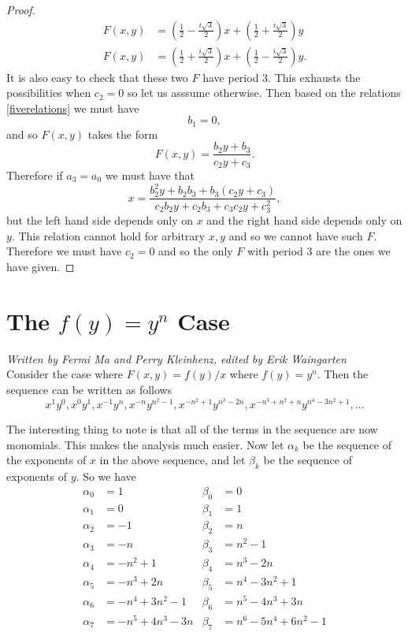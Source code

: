 \documentclass[12pt]{article}
\begin{document}
\begin{proof}
\begin{align*}
F(x,y) &= \left( \frac{1}{2} -\frac{i\sqrt{3}}{2} \right) x + \left( \frac{1}{2} +\frac{i\sqrt{3}}{2} \right) y \\
F(x,y) &= \left( \frac{1}{2} +\frac{i\sqrt{3}}{2} \right) x + \left( \frac{1}{2} -\frac{i\sqrt{3}}{2} \right) y.
\end{align*}
It is also easy to check that these two $F$ have period 3. This exhausts the possibilities when $c_2=0$ so let us asssume otherwise. Then based on the relations \ref{fiverelations} we must have 
\begin{equation*}
b_1 = 0,
\end{equation*}
and so $F(x,y)$ takes the form 
\begin{equation*}
F(x,y) = \frac{b_2 y + b_3}{c_2 y + c_3}.
\end{equation*}
Therefore if $a_3 = a_0$ we must have that 
\begin{equation*}
x = \frac{ b_2^2 y + b_2b_3 +b_3(c_2 y + c_3)}{c_2 b_2 y + c_2 b_3 + c_3 c_2 y + c_3^2},
\end{equation*}
but the left hand side depends only on $x$ and the right hand side depends only on $y$. This relation cannot hold for arbitrary $x,y$ and so we cannot have such $F$. Therefore we must have $c_2=0$ and so the only $F$ with period 3 are the ones we have given. 
\end{proof}


\section{The $f(y) = y^n$ Case}

\emph{Written by Fermi Ma and Perry Kleinhenz, edited by Erik Waingarten}\\

Consider the case where $F(x,y) = f(y)/x$ where $f(y) = y^n$. Then the sequence can be written as follows
\[ x^1y^0, x^0y^1, x^{-1}y^{n}, x^{-n}y^{n^2-1}, x^{-n^2+1}y^{n^3-2n},x^{-n^3+n^2+n}y^{n^4-3n^2+1}, \dots \]

The interesting thing to note is that all of the terms in the sequence are now monomials. This makes the analysis much easier. Now let $\alpha_k$ be the sequence of the exponents of $x$ in the above sequence, and let $\beta_k$ be the sequence of exponents of $y$. So we have
\begin{align*}
\alpha_0 &= 1  &\beta_0& = 0\\
\alpha_1 &= 0 &\beta_1& = 1\\
\alpha_2 &= -1  &\beta_2& = n\\
\alpha_3 &= -n &\beta_3& = n^2-1\\
\alpha_4 &= -n^2+1 &\beta_4& = n^3-2n\\
\alpha_5 &= -n^3+2n &\beta_5& =n^4-3n^2+1\\ 
\alpha_6 &= -n^4+3n^2 -1 &\beta_6& =n^5-4n^3+3n \\ 
\alpha_7 &= -n^5+4n^3 - 3n &\beta_7& =n^6-5n^4+6n^2 - 1
\end{align*}
\end{document}

